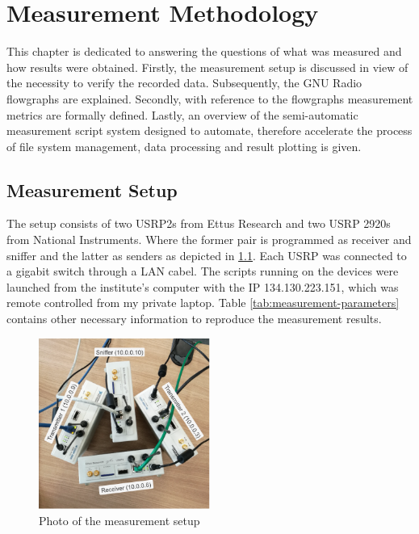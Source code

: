 \chapter{Measurement Methodology}

This chapter is dedicated to answering the questions of what was measured and how results were obtained. Firstly, the measurement setup is discussed in view of the necessity to verify the recorded data. Subsequently,  the GNU Radio flowgraphs are explained. Secondly, with reference to the flowgraphs measurement metrics are formally defined.  Lastly, an overview of the semi-automatic measurement script system designed to automate, therefore accelerate the process of file system management, data processing and result plotting is given.

\section{Measurement Setup}

The setup consists of two USRP2s from Ettus Research and two USRP 2920s from National Instruments. Where the former pair is programmed as receiver and sniffer and the latter  as senders as depicted in \ref{fig:measurement-setup}. Each USRP was connected to a gigabit switch through a LAN cabel. The scripts running on the devices were launched from the institute's computer with the IP 134.130.223.151, which was remote controlled from my private laptop. Table \ref{tab:measurement-parameters} contains other necessary information to reproduce the measurement results.

\begin{figure}[tb]
	\label{fig:measurement-setup}
	\begin{center}
		\includegraphics[width=0.5\textwidth]{pictures/measurement_setup}
	\end{center}
	\caption{Photo of the measurement setup}
\end{figure}

